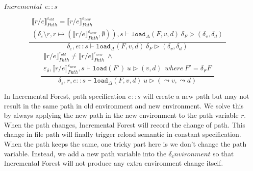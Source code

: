 \documentclass[10pt,twoside,a4paper]{article}
\theoremstyle{theorem}
\theoremstyle{lemma}
\theoremstyle{property}
\theoremstyle{definition}
\theoremstyle{assumption}
\begin{document}
$\boxed{Incremental~~e::s}$

\begin{displaymath}
	\frac{\begin{array}{c}
		\llbracket r/e \rrbracket^{\varepsilon_{old}}_{Path} = \llbracket r/e \rrbracket^{\varepsilon_{new}}_{Path}\\
		(\delta_\varepsilon \setminus r, r \mapsto (\llbracket r/e \rrbracket^{\varepsilon_{new}}_{Path},\emptyset)) , s \vdash \mathtt{load}_\Delta (F,v,d)~ \delta_F \rhd (\delta_v,\delta_d)
	\end{array}}
	{
		\delta_\varepsilon, e::s \vdash \mathtt{load}_\Delta (F,v,d)~ \delta_F \rhd (\delta_v,\delta_d)
	}
\end{displaymath}
\begin{displaymath}
	\frac{\begin{array}{c}
		\llbracket r/e \rrbracket^{\varepsilon_{old}}_{Path} \not= \llbracket r/e \rrbracket^{\varepsilon_{new}}_{Path} ~\land \\
		\varepsilon_\delta, \llbracket r/e \rrbracket^{\varepsilon_{new}}_{Path} , s \vdash \mathtt{load}(F')~ u \rhd (v,d) ~~ where ~ F' = \delta_F F
	\end{array}}
	{
		\delta_\varepsilon, r, e::s \vdash \mathtt{load}_\Delta (F,v,d)~ u \rhd (\leadsto v,\leadsto d)
	}
\end{displaymath}

In Incremental Forest, path specification $e\!::\!s$ will create a new path but may not result in the same path in old environment and new environment. 
We solve this by always applying the new path in the new environment to the path variable $r$. 
When the path changes, Incremental Forest will record the change of path. This change in file path will finally trigger reload semantic in constant specification.
When the path keeps the same, one tricky part here is we don't change the path variable. Instead, we add a new path variable into the $\delta_environment$ so that Incremental Forest will not produce any extra environment change itself.\\
\end{document}
